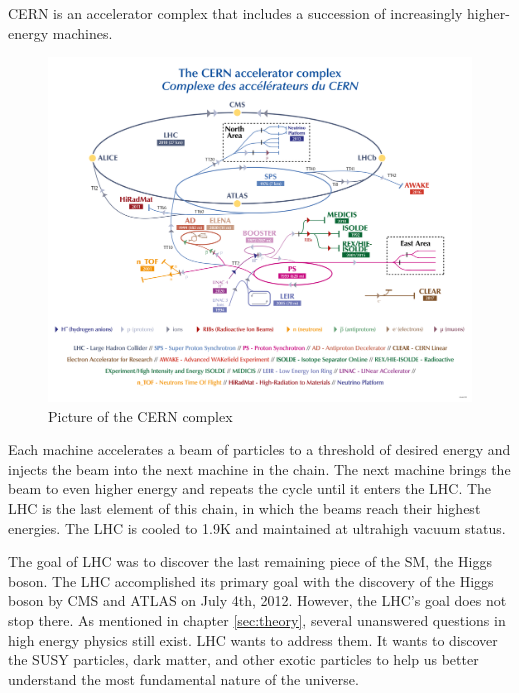 CERN is an accelerator complex that includes a succession of increasingly higher-energy machines.
\begin{figure}[h!]
	\caption{Picture of the CERN complex \cite{CERN}}
  \label{fig:CERN}
  \centering
  \includegraphics[width=1.0\linewidth]{figs/LHC.png}
\end{figure}
Each machine accelerates a beam of particles to a threshold of desired energy and injects the beam into the next machine in the chain.
The next machine brings the beam to even higher energy and repeats the cycle until it enters the LHC.
The LHC is the last element of this chain, in which the beams reach their highest energies.
The LHC is cooled to 1.9K and maintained at ultrahigh vacuum status.

The goal of LHC was to discover the last remaining piece of the SM, the Higgs boson.
The LHC accomplished its primary goal with the discovery of the Higgs boson by CMS and ATLAS on July 4th, 2012.
However, the LHC's goal does not stop there.
As mentioned in chapter \ref{sec:theory}, several unanswered questions in high energy physics still exist.
LHC wants to address them. It wants to discover the SUSY particles, dark matter, and other exotic particles to help us better understand the most fundamental nature of the universe.

